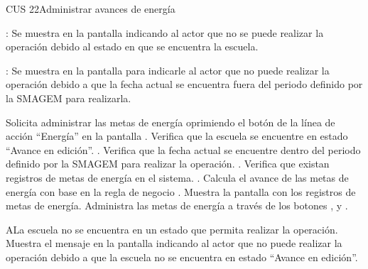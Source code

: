 \begin{UseCase}{CUS 22}{Administrar avances de energía}
{\begin{UClist}
	    \UCli {}: Se muestra en la pantalla  indicando al actor que no se puede realizar la operación debido al estado en que se encuentra la escuela.
	    
	    \UCli {}: Se muestra en la pantalla  para indicarle al actor que no puede realizar la operación debido a que la fecha actual se encuentra fuera del periodo definido por la SMAGEM para realizarla.
	    
	\end{UClist}
    }

    


\end{UseCase}


 \begin{UCtrayectoria}
    \UCpaso[\UCactor] Solicita administrar las metas de energía oprimiendo el botón \botAcciones de la línea de acción ``Energía'' en la pantalla .
    \UCpaso[\UCsist] Verifica que la escuela se encuentre en estado ``Avance en edición''. .
    \UCpaso[\UCsist] Verifica que la fecha actual se encuentre dentro del periodo definido por la SMAGEM para realizar la operación. .
    \UCpaso[\UCsist] Verifica que existan registros de metas de energía en el sistema. .
    \UCpaso[\UCsist] Calcula el avance de las metas de energía con base en la regla de negocio .
    \UCpaso[\UCsist] Muestra la pantalla  con los registros de metas de energía.
    \UCpaso[\UCactor] Administra las metas de energía a través de los botones \botMetas, \botAutoAjus y . \label{cus22:Administrar}
 \end{UCtrayectoria}
 
    \begin{UCtrayectoriaA}{A}{La escuela no se encuentra en un estado que permita realizar la operación.}
    \UCpaso[\UCsist] Muestra el mensaje  en la pantalla   indicando al actor que no puede realizar la operación debido a que la escuela no se encuentra en estado ``Avance en edición''. 
 \end{UCtrayectoriaA}
 
